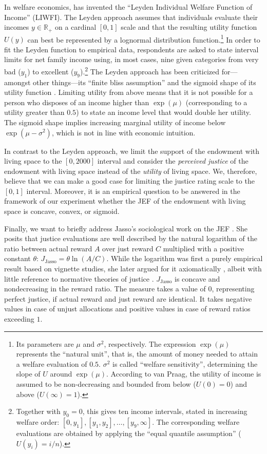 \documentclass[12pt]{scrartcl}
\begin{document}
In welfare economics, \citet{van_praag_individual_1968,van_praag_welfare_1971} has invented the ``Leyden Individual Welfare Function of Income'' (LIWFI).
The Leyden approach assumes that individuals evaluate their incomes $y\in\mathds{R}_+$ on a cardinal $[0,1]$ scale and that the resulting utility function $U(y)$ can best be represented by a lognormal distribution function.\footnote{Its parameters are $\mu$ and $\sigma^2$, respectively. The expression $\exp(\mu)$ represents the ``natural unit'', that is, the amount of money needed to attain a welfare evaluation of $0.5$. $\sigma^2$ is called ``welfare sensitivity'', determining the slope of $U$ around $\exp(\mu)$. According to van Praag, the utility of income is assumed to be non-decreasing and bounded from below ($U(0)=0$) and above ($U(\infty)=1$).}
In order to fit the Leyden function to empirical data, respondents are asked to state interval limits for net family income using, in most cases, nine given categories from very bad ($y_1$) to excellent ($y_9$).\footnote{Together with $y_0=0$, this gives ten income intervals, stated in increasing welfare order: $[0,y_1],[y_1,y_2],\ldots,[y_9,\infty]$.
The corresponding welfare evaluations are obtained by applying the ``equal quantile assumption'' ($U(y_i)=i/n$).}
The Leyden approach has been criticized for---amongst other things---its ``finite bliss assumption'' and the sigmoid shape of its utility function \citep{seidl_how_1994}.
Limiting utility from above means that it is not possible for a person who disposes of an income higher than $\exp(\mu)$ (corresponding to a utility greater than $0.5$) to state an income level that would double her utility.
The sigmoid shape implies increasing marginal utility of income below $\exp(\mu-\sigma^2)$, which is not in line with economic intuition.

In contrast to the Leyden approach, we limit the support of the endowment with living space to the $[0,2000]$ interval and consider the \textit{perceived justice} of the endowment with living space instead of the \textit{utility} of living space.
We, therefore, believe that we can make a good case for limiting the justice rating scale to the $[0,1]$ interval.
Moreover, it is an empirical question to be answered in the framework of our experiment whether the JEF of the endowment with living space is concave, convex, or sigmoid.

Finally, we want to briefly address Jasso's sociological work on the JEF \citep[e.\,g.,][]{jasso_justice_1978,jasso_methods_1990}.
She posits that justice evaluations are well described by the natural logarithm of the ratio between actual reward $A$ over just reward $C$ multiplied with a positive constant $\theta$: $J_\text{Jasso}=\theta\ln(A/C)$.
While the logarithm was first a purely empirical result based on vignette studies, she later argued for it axiomatically \citep{jasso_methods_1990}, albeit with little reference to normative theories of justice \citep[but also see, e.\,g.,][]{jasso_is_2020}.
$J_\text{Jasso}$ is concave and nondecreasing in the reward ratio.
The measure takes a value of $0$, representing perfect justice, if actual reward and just reward are identical.
It takes negative values in case of unjust allocations and positive values in case of reward ratios exceeding $1$.
\end{document}
